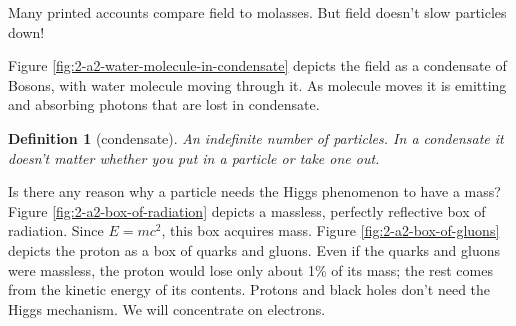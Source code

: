 \documentclass[]{article}
\newtheorem{defn}[thm]{Definition}
\begin{document}
Many printed accounts compare field to molasses. But field doesn't slow particles down! 

Figure \ref{fig:2-a2-water-molecule-in-condensate} depicts the field as a condensate of Bosons, with water molecule moving through it. As molecule moves it is emitting and absorbing photons that are lost in condensate.

\begin{defn}[condensate]
	An indefinite number of particles. In a condensate it doesn't matter whether you put in a particle or take one out.
\end{defn}

Is there any reason why a particle needs the Higgs phenomenon to have a  mass? Figure \ref{fig:2-a2-box-of-radiation} depicts a massless, perfectly reflective box of radiation. Since $E=mc^2$, this box acquires mass. Figure \ref{fig:2-a2-box-of-gluons} depicts the proton as a box of quarks and gluons. Even if the quarks and gluons were massless, the proton would lose only about 1\% of its mass; the rest comes from the kinetic energy of its contents. Protons and black holes don't need the Higgs mechanism. We will concentrate on electrons.
\end{document}
